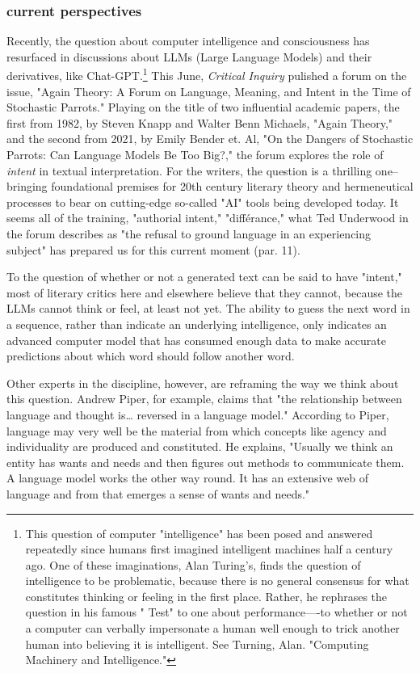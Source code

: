 \documentclass[11pt]{article}
\begin{document}
\subsubsection{current perspectives}
\label{sec:org25c1b85}
Recently, the question about computer intelligence and consciousness
has resurfaced in discussions about LLMs (Large Language Models) and
their derivatives, like Chat-GPT.\footnote{This question of computer "intelligence" has been posed and
answered repeatedly since humans first imagined intelligent machines
half a century ago. One of these imaginations, Alan Turing's, finds
the question of intelligence to be problematic, because there is no
general consensus for what constitutes thinking or feeling in the
first place. Rather, he rephrases the question in his famous " Test"
to one about performance—-to whether or not a computer can verbally
impersonate a human well enough to trick another human into believing
it is intelligent. See Turning, Alan. "Computing Machinery and
Intelligence."} This June, \emph{Critical Inquiry}
pulished a forum on the issue, "Again Theory: A Forum on Language,
Meaning, and Intent in the Time of Stochastic Parrots." Playing on the
title of two influential academic papers, the first from 1982, by
Steven Knapp and Walter Benn Michaels, "Again Theory," and the second
from 2021, by Emily Bender et. Al, "On the Dangers of Stochastic
Parrots: Can Language Models Be Too Big?," the forum explores the role
of \emph{intent} in textual interpretation. For the writers, the question
is a thrilling one--bringing foundational premises for 20th century
literary theory and hermeneutical processes to bear on cutting-edge
so-called "AI" tools being developed today. It seems all of the
training, "authorial intent," "différance," what Ted Underwood in the
forum describes as "the refusal to ground language in an experiencing
subject" has prepared us for this current moment (par. 11).

To the question of whether or not a generated text can be said to have
"intent," most of literary critics here and elsewhere believe that
they cannot, because the LLMs cannot think or feel, at least not
yet. The ability to guess the next word in a sequence, rather than
indicate an underlying intelligence, only indicates an advanced
computer model that has consumed enough data to make accurate
predictions about which word should follow another word.

Other experts in the discipline, however, are reframing the way we
think about this question. Andrew Piper, for example, claims that "the
relationship between language and thought is\ldots{} reversed in a language
model." According to Piper, language may very well be the material
from which concepts like agency and individuality are produced and
constituted. He explains, "Usually we think an entity has wants and
needs and then figures out methods to communicate them. A language
model works the other way round. It has an extensive web of language
and from that emerges a sense of wants and needs."
\end{document}
